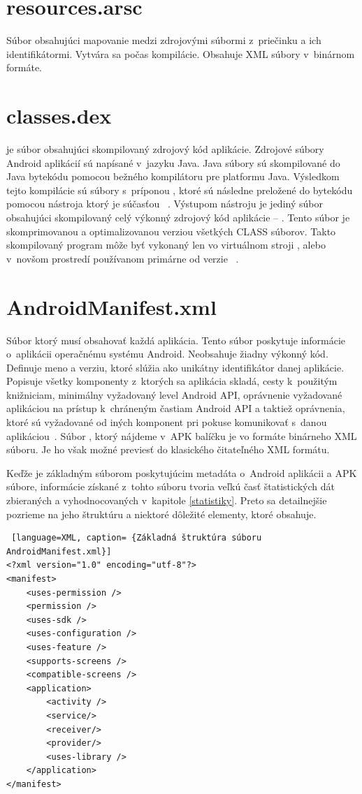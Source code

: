 \section{resources.arsc}
\label{resources.arsc}
Súbor obsahujúci mapovanie medzi zdrojovými súbormi  z~priečinku  a ich identifikátormi.  Vytvára sa počas kompilácie. Obsahuje XML súbory v~binárnom formáte.

\section{classes.dex}
\label{classes.dex}
 je súbor obsahujúci skompilovaný zdrojový kód aplikácie.  Zdrojové súbory Android aplikácií sú napísané v~jazyku Java. Java súbory sú skompilované do Java bytekódu pomocou bežného kompilátoru pre platformu Java. Výsledkom tejto kompilácie sú súbory s~príponou , ktoré sú následne preložené do  bytekódu pomocou nástroja  ktorý je súčasťou ~\cite{Reddy2014}. Výstupom nástroju  je jediný súbor obsahujúci skompilovaný celý výkonný zdrojový kód aplikácie -- . Tento súbor je skomprimovanou a optimalizovanou verziou všetkých CLASS súborov. Takto skompilovaný program môže byť vykonaný len vo virtuálnom stroji , alebo v~novšom prostredí  používanom primárne od verzie ~\cite{dalvik}.

\section{AndroidManifest.xml} 
\label{AndroidManifest.xml}
Súbor ktorý musí obsahovať každá aplikácia. Tento súbor poskytuje informácie o~aplikácii operačnému systému Android. Neobsahuje žiadny výkonný kód. Definuje meno a verziu, ktoré slúžia ako unikátny identifikátor danej aplikácie. Popisuje všetky komponenty z~ktorých sa aplikácia skladá, cesty k~použitým knižniciam, minimálny vyžadovaný level Android API, oprávnenie vyžadované aplikáciou na prístup k~chráneným častiam Android API a taktiež oprávnenia, ktoré sú vyžadované od iných komponent pri pokuse komunikovať s~danou aplikáciou~\cite{appManifest}. Súbor , ktorý nájdeme v~APK balíčku je vo formáte binárneho XML súboru. Je ho však možné previesť do klasického čitateľného XML formátu.

Keďže  je základným súborom poskytujúcim metadáta o~Android aplikácii a APK súbore, informácie získané z~tohto súboru tvoria veľkú časť štatistických dát zbieraných a vyhodnocovaných v~kapitole \ref{statistiky}. Preto sa detailnejšie pozrieme na jeho štruktúru a niektoré dôležité elementy, ktoré obsahuje.
\begin{lstlisting} [language=XML, caption= {Základná štruktúra súboru AndroidManifest.xml}]
<?xml version="1.0" encoding="utf-8"?>
<manifest>
    <uses-permission />
    <permission />
    <uses-sdk />
    <uses-configuration />  
    <uses-feature />  
    <supports-screens />  
    <compatible-screens />  
    <application>
        <activity />
        <service/>
        <receiver/>
        <provider/>
        <uses-library />
    </application>
</manifest>
\end{lstlisting}

